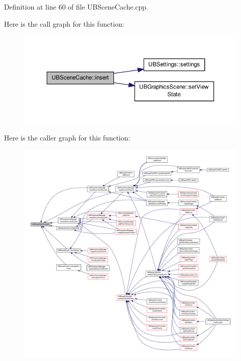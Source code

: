 Definition at line 60 of file U\-B\-Scene\-Cache.\-cpp.



Here is the call graph for this function\-:
\nopagebreak
\begin{figure}[H]
\begin{center}
\leavevmode
\includegraphics[width=350pt]{d2/d79/class_u_b_scene_cache_aa3377f2b95c0245c99e6ee6932f78472_cgraph}
\end{center}
\end{figure}




Here is the caller graph for this function\-:
\nopagebreak
\begin{figure}[H]
\begin{center}
\leavevmode
\includegraphics[width=350pt]{d2/d79/class_u_b_scene_cache_aa3377f2b95c0245c99e6ee6932f78472_icgraph}
\end{center}
\end{figure}


